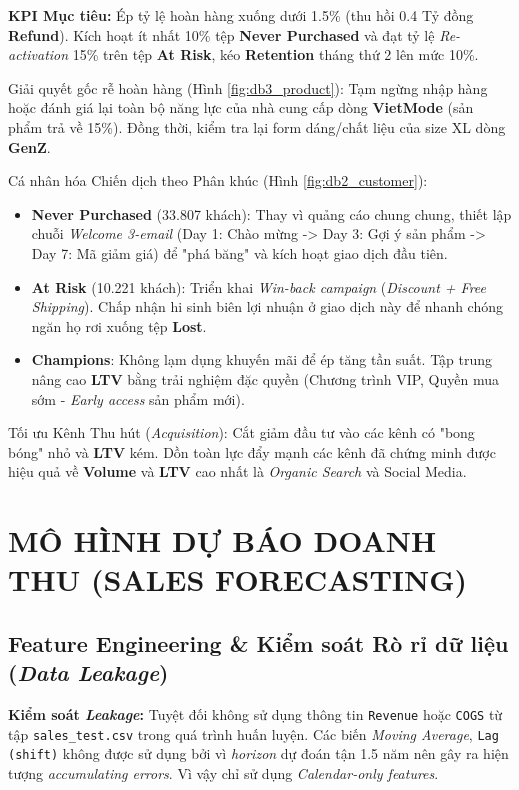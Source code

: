\documentclass{article}
\begin{document}
\textbf{KPI Mục tiêu:} Ép tỷ lệ hoàn hàng xuống dưới 1.5\% (thu hồi 0.4 Tỷ đồng \textbf{Refund}). Kích hoạt ít nhất 10\% tệp \textbf{Never Purchased} và đạt tỷ lệ \textit{Re-activation} 15\% trên tệp \textbf{At Risk}, kéo \textbf{Retention} tháng thứ 2 lên mức 10\%.

Giải quyết gốc rễ hoàn hàng (Hình \ref{fig:db3_product}): Tạm ngừng nhập hàng hoặc đánh giá lại toàn bộ năng lực của nhà cung cấp dòng \textbf{VietMode} (sản phẩm trả về 15\%). Đồng thời, kiểm tra lại form dáng/chất liệu của size XL dòng \textbf{GenZ}.

Cá nhân hóa Chiến dịch theo Phân khúc (Hình \ref{fig:db2_customer}):
\begin{itemize}
\item \textbf{Never Purchased} (33.807 khách): Thay vì quảng cáo chung chung, thiết lập chuỗi \textit{Welcome 3-email} (Day 1: Chào mừng -> Day 3: Gợi ý sản phẩm -> Day 7: Mã giảm giá) để "phá băng" và kích hoạt giao dịch đầu tiên.

\item \textbf{At Risk} (10.221 khách): Triển khai \textit{Win-back campaign} (\textit{Discount + Free Shipping}). Chấp nhận hi sinh biên lợi nhuận ở giao dịch này để nhanh chóng ngăn họ rơi xuống tệp \textbf{Lost}.

\item \textbf{Champions}: Không lạm dụng khuyến mãi để ép tăng tần suất. Tập trung nâng cao \textbf{LTV} bằng trải nghiệm đặc quyền (Chương trình VIP, Quyền mua sớm - \textit{Early access} sản phẩm mới).

\end{itemize}

Tối ưu Kênh Thu hút (\textit{Acquisition}): Cắt giảm đầu tư vào các kênh có "bong bóng" nhỏ và \textbf{LTV} kém. Dồn toàn lực đẩy mạnh các kênh đã chứng minh được hiệu quả về \textbf{Volume} và \textbf{LTV} cao nhất là \textit{Organic Search} và Social Media.


\section{MÔ HÌNH DỰ BÁO DOANH THU (SALES FORECASTING)}

\subsection{\textbf{Feature Engineering} \& Kiểm soát Rò rỉ dữ liệu (\textit{Data Leakage})}
\textbf{Kiểm soát \textit{Leakage}:} Tuyệt đối không sử dụng thông tin \texttt{Revenue} hoặc \texttt{COGS} từ tập \texttt{sales\_test.csv} trong quá trình huấn luyện. Các biến \textit{Moving Average}, \texttt{Lag (shift)} không được sử dụng bởi vì \textit{horizon} dự đoán tận 1.5 năm nên gây ra hiện tượng \textit{accumulating errors}. Vì vậy chỉ sử dụng \textit{Calendar-only features}.
\end{document}
